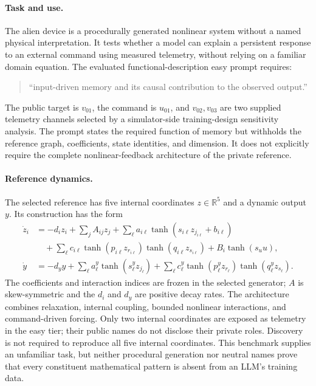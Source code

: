\paragraph{Task and use.}
The alien device is a procedurally generated nonlinear system without a named
physical interpretation. It tests whether a model can explain a persistent
response to an external command using measured telemetry, without relying on
a familiar domain equation. The evaluated functional-description easy prompt
requires:
\begin{quote}
``input-driven memory and its causal contribution to the observed output.''
\end{quote}
The public target is $v_{01}$, the command is $u_{01}$, and $v_{02},v_{03}$ are
two supplied telemetry channels selected by a simulator-side training-design
sensitivity analysis. The prompt states the required function of memory but
withholds the reference graph, coefficients, state identities, and dimension.
It does not explicitly require the complete nonlinear-feedback architecture
of the private reference.

\paragraph{Reference dynamics.}
The selected reference has five internal coordinates $z\in\mathbb{R}^5$ and a
dynamic output $y$. Its construction has the form
\begin{align}
\dot z_i &= -d_i z_i+\sum_j A_{ij}z_j
 +\sum_{\ell}a_{i\ell}\tanh(s_{i\ell}z_{j_{i\ell}}+b_{i\ell})
 \nonumber\\
&\quad+\sum_{\ell}c_{i\ell}
 \tanh(p_{i\ell}z_{r_{i\ell}})\tanh(q_{i\ell}z_{s_{i\ell}})
 +B_i\tanh(s_u u), \\
\dot y &= -d_y y+\sum_{\ell}a^y_{\ell}\tanh(s^y_{\ell}z_{j_{\ell}})
 +\sum_{\ell}c^y_{\ell}
 \tanh(p^y_{\ell}z_{r_{\ell}})\tanh(q^y_{\ell}z_{s_{\ell}}).
\end{align}
The coefficients and interaction indices are frozen in the selected generator;
$A$ is skew-symmetric and the $d_i$ and $d_y$ are positive decay rates. The
architecture combines relaxation, internal coupling, bounded nonlinear
interactions, and command-driven forcing. Only two internal coordinates are
exposed as telemetry in the easy tier; their public names do not disclose
their private roles. Discovery is not required to reproduce all five internal
coordinates. This benchmark supplies an unfamiliar task, but neither procedural
generation nor neutral names prove that every constituent mathematical pattern
is absent from an LLM's training data.


